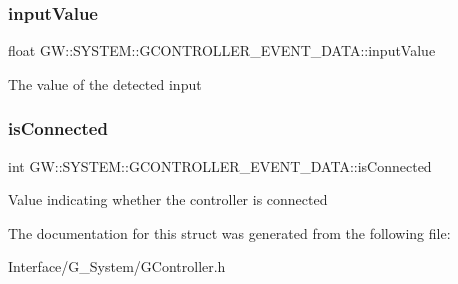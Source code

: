 \subsubsection{\texorpdfstring{inputValue}{inputValue}}
{\footnotesize\ttfamily float G\+W\+::\+S\+Y\+S\+T\+E\+M\+::\+G\+C\+O\+N\+T\+R\+O\+L\+L\+E\+R\+\_\+\+E\+V\+E\+N\+T\+\_\+\+D\+A\+T\+A\+::input\+Value}

The value of the detected input \mbox{\label{structGW_1_1SYSTEM_1_1GCONTROLLER__EVENT__DATA_a75772bfa2f01fe8408ffec36be9f0c70}} 
\subsubsection{\texorpdfstring{isConnected}{isConnected}}
{\footnotesize\ttfamily int G\+W\+::\+S\+Y\+S\+T\+E\+M\+::\+G\+C\+O\+N\+T\+R\+O\+L\+L\+E\+R\+\_\+\+E\+V\+E\+N\+T\+\_\+\+D\+A\+T\+A\+::is\+Connected}

Value indicating whether the controller is connected 

The documentation for this struct was generated from the following file\+:\begin{DoxyCompactItemize}
\item 
Interface/\+G\+\_\+\+System/G\+Controller.\+h\end{DoxyCompactItemize}
